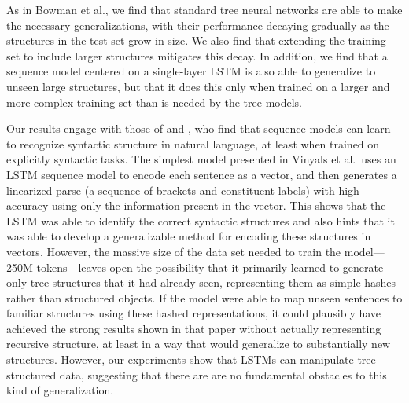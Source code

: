 As in Bowman et al., we find that standard tree neural networks are able to make the necessary generalizations, with their performance decaying gradually as the structures in the test set grow in size. We also find that extending the training set to include larger structures mitigates this decay. In addition, we find that a sequence model centered on a single-layer LSTM is also able to generalize to unseen large structures, but that it does this only when trained on a larger and more complex training set than is needed by the tree models. 

Our results engage with those of  and , who find that sequence models can learn to recognize syntactic structure in natural language, at least when trained on explicitly syntactic tasks. The simplest model presented in Vinyals et al.~uses an LSTM sequence model to encode each sentence as a vector, and then generates a linearized parse (a sequence of brackets and constituent labels) with high accuracy using only the information present in the vector. This shows that the LSTM was able to identify the correct syntactic structures and also hints that it was able to develop a generalizable method for encoding these structures in vectors. However, the massive size of the data set needed to train the model---250M tokens---leaves open the possibility that it primarily learned to generate only tree structures that it had already seen, representing them as simple hashes rather than structured objects. If the model were able to map unseen sentences to familiar structures using these hashed representations, it could plausibly have achieved the strong results shown in that paper without actually representing recursive structure, at least in a way that would generalize to substantially new structures. However, our experiments show that LSTMs can manipulate tree-structured data, suggesting that there are are no fundamental obstacles to this kind of generalization.
